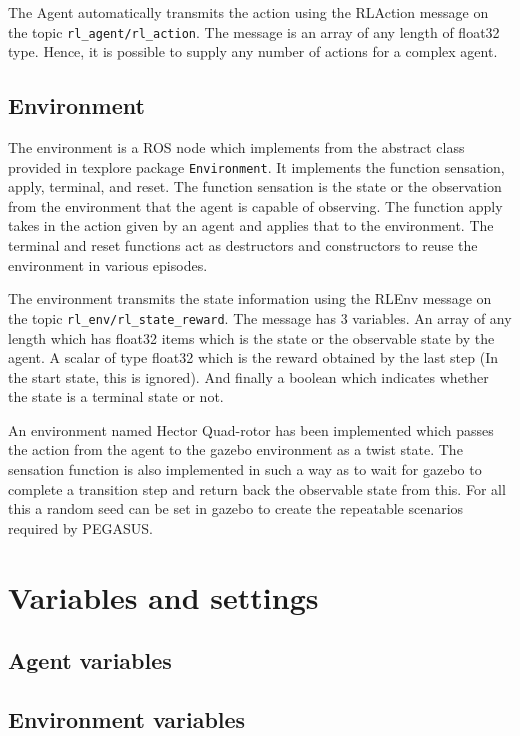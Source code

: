\documentclass[BTech]{iitmdiss}
\begin{document}
The Agent automatically transmits the action using the RLAction message on the topic \texttt{rl\_agent/rl\_action}. The message is an array of any length of float32 type. Hence, it is possible to supply any number of actions for a complex agent.

\subsection*{Environment}

The environment is a ROS node which implements from the abstract class provided in texplore package \texttt{Environment}. It implements the function sensation, apply, terminal, and reset. The function sensation is the state or the observation from the environment that the agent is capable of observing. The function apply takes in the action given by an agent and applies that to the environment. The terminal and reset functions act as destructors and constructors to reuse the environment in various episodes.

The environment transmits the state information using the RLEnv message on the topic \texttt{rl\_env/rl\_state\_reward}. The message has 3 variables. An array of any length which has float32 items which is the state or the observable state by the agent. A scalar of type float32 which is the reward obtained by the last step (In the start state, this is ignored). And finally a boolean which indicates whether the state is a terminal state or not.

An environment named Hector Quad-rotor has been implemented which passes the action from the agent to the gazebo environment as a twist state. The sensation function is also implemented in such a way as to wait for gazebo to complete a transition step and return back the observable state from this. For all this a random seed can be set in gazebo to create the repeatable scenarios required by PEGASUS.

\section{Variables and settings}
\subsection{Agent variables}
\subsection{Environment variables}
\end{document}
